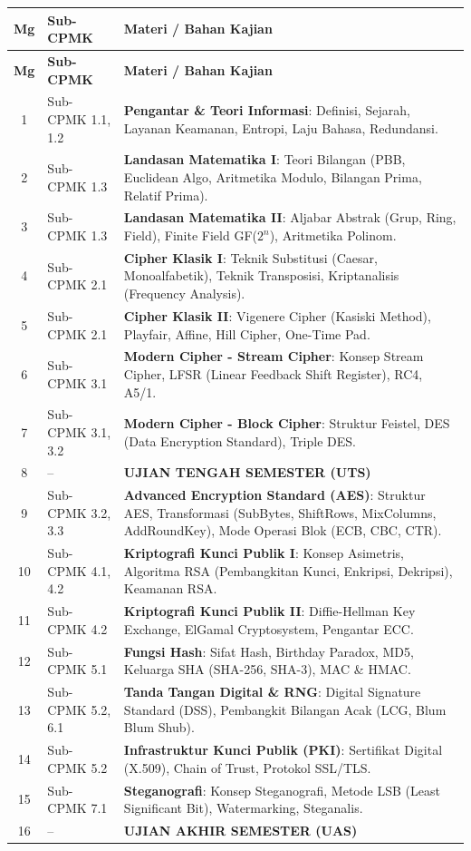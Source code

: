 \documentclass[12pt,a4paper]{article}
\begin{document}
\begin{longtable}{|c|p{4cm}|p{8cm}|}
\hline
\textbf{Mg} & \textbf{Sub-CPMK} & \textbf{Materi / Bahan Kajian} \\
\hline
\endfirsthead
\hline
\textbf{Mg} & \textbf{Sub-CPMK} & \textbf{Materi / Bahan Kajian} \\
\hline
\endhead
1 & Sub-CPMK 1.1, 1.2 & \textbf{Pengantar \& Teori Informasi}: Definisi, Sejarah, Layanan Keamanan, Entropi, Laju Bahasa, Redundansi. \\
\hline
2 & Sub-CPMK 1.3 & \textbf{Landasan Matematika I}: Teori Bilangan (PBB, Euclidean Algo, Aritmetika Modulo, Bilangan Prima, Relatif Prima). \\
\hline
3 & Sub-CPMK 1.3 & \textbf{Landasan Matematika II}: Aljabar Abstrak (Grup, Ring, Field), Finite Field GF($2^n$), Aritmetika Polinom. \\
\hline
4 & Sub-CPMK 2.1 & \textbf{Cipher Klasik I}: Teknik Substitusi (Caesar, Monoalfabetik), Teknik Transposisi, Kriptanalisis (Frequency Analysis). \\
\hline
5 & Sub-CPMK 2.1 & \textbf{Cipher Klasik II}: Vigenere Cipher (Kasiski Method), Playfair, Affine, Hill Cipher, One-Time Pad. \\
\hline
6 & Sub-CPMK 3.1 & \textbf{Modern Cipher - Stream Cipher}: Konsep Stream Cipher, LFSR (Linear Feedback Shift Register), RC4, A5/1. \\
\hline
7 & Sub-CPMK 3.1, 3.2 & \textbf{Modern Cipher - Block Cipher}: Struktur Feistel, DES (Data Encryption Standard), Triple DES. \\
\hline
8 & -- & \textbf{UJIAN TENGAH SEMESTER (UTS)} \\
\hline
9 & Sub-CPMK 3.2, 3.3 & \textbf{Advanced Encryption Standard (AES)}: Struktur AES, Transformasi (SubBytes, ShiftRows, MixColumns, AddRoundKey), Mode Operasi Blok (ECB, CBC, CTR). \\
\hline
10 & Sub-CPMK 4.1, 4.2 & \textbf{Kriptografi Kunci Publik I}: Konsep Asimetris, Algoritma RSA (Pembangkitan Kunci, Enkripsi, Dekripsi), Keamanan RSA. \\
\hline
11 & Sub-CPMK 4.2 & \textbf{Kriptografi Kunci Publik II}: Diffie-Hellman Key Exchange, ElGamal Cryptosystem, Pengantar ECC. \\
\hline
12 & Sub-CPMK 5.1 & \textbf{Fungsi Hash}: Sifat Hash, Birthday Paradox, MD5, Keluarga SHA (SHA-256, SHA-3), MAC \& HMAC. \\
\hline
13 & Sub-CPMK 5.2, 6.1 & \textbf{Tanda Tangan Digital \& RNG}: Digital Signature Standard (DSS), Pembangkit Bilangan Acak (LCG, Blum Blum Shub). \\
\hline
14 & Sub-CPMK 5.2 & \textbf{Infrastruktur Kunci Publik (PKI)}: Sertifikat Digital (X.509), Chain of Trust, Protokol SSL/TLS. \\
\hline
15 & Sub-CPMK 7.1 & \textbf{Steganografi}: Konsep Steganografi, Metode LSB (Least Significant Bit), Watermarking, Steganalis. \\
\hline
16 & -- & \textbf{UJIAN AKHIR SEMESTER (UAS)} \\
\hline
\end{longtable}
\end{document}
